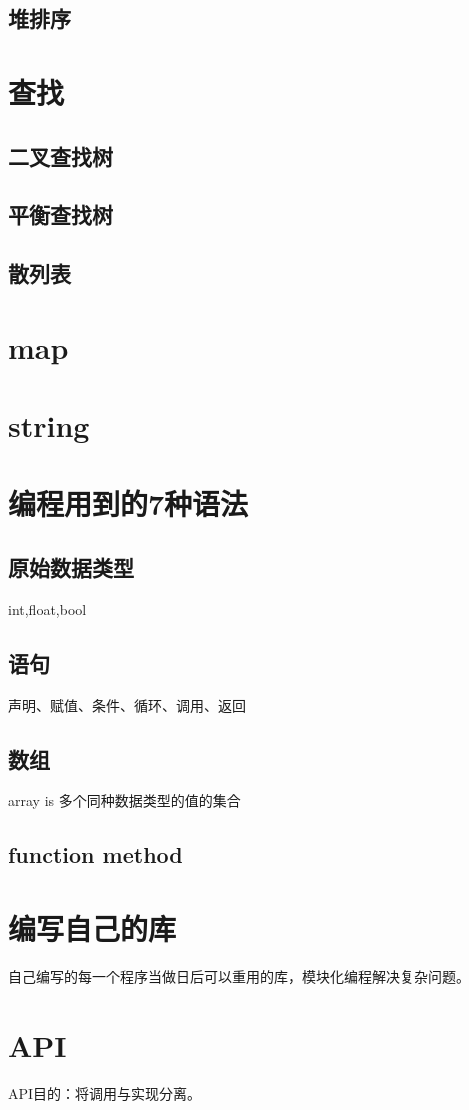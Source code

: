 \documentclass[UTF8]{ctexart}
\begin{document}
\subsection{堆排序}

\section{查找}
\subsection{二叉查找树}
\subsection{平衡查找树}
\subsection{散列表}

\section{map}

\section{string}

\section{编程用到的7种语法}
\subsection{原始数据类型}
int,float,bool
\subsection{语句}
声明、赋值、条件、循环、调用、返回
\subsection{数组}
array is 多个同种数据类型的值的集合
\subsection{function method}

\section{编写自己的库}
自己编写的每一个程序当做日后可以重用的库，模块化编程解决复杂问题。

\section{API}
API目的：将调用与实现分离。
\end{document}
